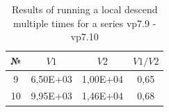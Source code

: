 \documentclass{ifacconf}
\begin{document}
\begin{table}[ht]
	\centering
	\begin{tabular}{|c|c|c|c|}
		\hline
		\hspace*{0.1cm}№\hspace*{0.1cm} &
		\hspace*{0.1cm}$V1$\hspace*{0.1cm}&
		\hspace*{0.1cm}$V2$\hspace*{0.1cm}&
		\hspace*{0.1cm}$V1/V2$\hspace*{0.1cm}\\
		\hline
		9  & 6,50E+03  &  1,00E+04  &  0,65\\
		10 & 9,95E+03  &  1,46E+04  &  0,68\\
		\hline
	\end{tabular}
	\caption{Results of running a local descend multiple times for a series vp7.9 - vp7.10}	\label{spher_vp7}
\end{table}
\end{document}
